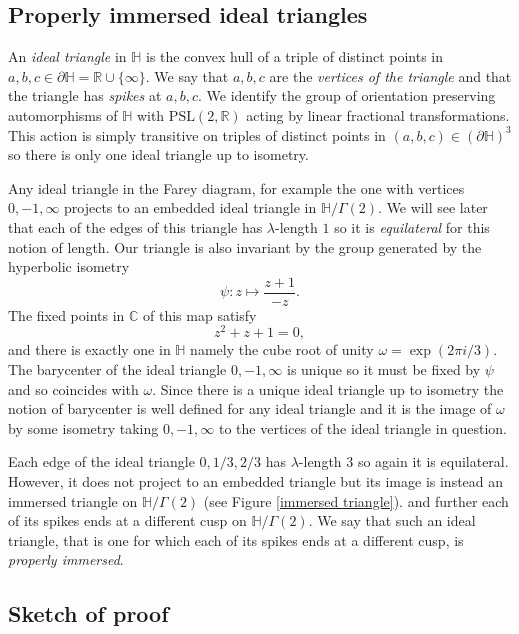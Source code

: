 \documentclass[12pt]{amsart}
\theoremstyle{plain}
\theoremstyle{definition}
\def\HH{\mathbb{H}}
\def\xx{\HH/g2}
\def\CC{\mathbb{C}}
\def\RR{\mathbb{R}}
\def\slr{\mathrm{PSL}(2, \RR)}
\def\g2{\Gamma(2)}
\def\xx{\HH/\g2}
\begin{document}
\subsection{Properly immersed ideal triangles}

An \textit{ideal triangle} in $\HH$  is the convex hull 
of a triple of distinct points in $a,b,c \in \partial \HH = \RR \cup \{ \infty \}$.
We say that $a,b,c$ are the \textit{vertices of the triangle}
and that the triangle has \textit{spikes} at $a,b,c$.
We identify the  group of orientation preserving automorphisms of $\HH$
 with $\slr$ acting by linear fractional transformations.
This action is simply transitive  on
triples of distinct points in $(a,b,c) \in (\partial \HH)^3$
so there is only one ideal triangle up to isometry.

Any  ideal triangle in the Farey diagram, 
for example the one with vertices $0,-1,\infty$
projects to an embedded ideal triangle in $\xx$.
We will see later that each of the edges
of this triangle has $\lambda$-length $1$
so it is \textit{equilateral} for this notion of length.
Our triangle is also invariant by the group generated by the
hyperbolic isometry
$$ \psi: z \mapsto \frac{z+1}{-z  }.$$
The fixed points in $\CC$ of this map satisfy
$$z^2 + z + 1 = 0,$$
and there is exactly one in $\HH$ 
namely the cube root of unity $\omega= \exp(2\pi i/3)$.
The {barycenter} 
of the ideal triangle $0,-1,\infty$
is unique so it must be fixed by $\psi$ 
and so coincides with $\omega$.
Since there is a unique ideal triangle up to isometry 
the notion of barycenter is well defined for any ideal triangle and
it is the image of $\omega$ by some isometry taking $0,-1,\infty$ to
the vertices of the ideal triangle in question.


Each edge of the ideal triangle $0,1/3,2/3$
has $\lambda$-length $3$ 
so again it is equilateral.
However, it does not project to  an embedded triangle
but its image is instead an immersed triangle on $\xx$
(see Figure \ref{immersed triangle}).
and further each of its spikes ends at a different cusp on 
$\xx$.
We say that such an ideal triangle,
that is one for which 
each of its spikes ends at a different cusp,
is \textit{properly immersed}.


\subsection{Sketch of proof}
\end{document}
